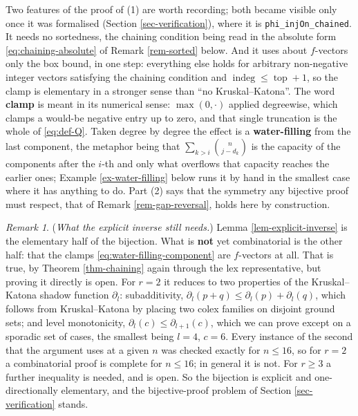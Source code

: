 \documentclass[11pt, a4paper, abstract=yes]{scrartcl}
\theoremstyle{definition}
\theoremstyle{remark}
\newtheorem{remark}[definition]{Remark}
\theoremstyle{plain}
\newcommand{\indeg}{\operatorname{indeg}}
\newcommand{\tp}{\operatorname{top}}
\begin{document}
Two features of the proof of (1) are worth recording; both became visible only once it was
formalised (Section \ref{sec-verification}), where it is \texttt{phi\_injOn\_chained}. It needs no sortedness,
the chaining condition being read in the absolute form \eqref{eq:chaining-absolute} of Remark
\ref{rem-sorted} below. And it uses about \(f\)-vectors only the box bound, in one step: everything
else holds for arbitrary non-negative integer vectors satisfying the chaining condition and
\(\indeg\le\tp+1\), so the clamp is elementary in a stronger sense than ``no Kruskal--Katona''. The
word \textbf{clamp} is meant in its numerical sense: \(\max(0,\cdot)\) applied degreewise, which clamps a
would-be negative entry up to zero, and that single truncation is the whole of \eqref{eq:def-Q}.
Taken degree by degree the effect is a \textbf{water-filling} from the last component, the metaphor being
that \(\sum_{k>i}\binom n{j-d_k}\) is the capacity of the components after the \(i\)-th and only what
overflows that capacity reaches the earlier ones; Example \ref{ex-water-filling} below runs it by hand
in the smallest case where it has anything to do. Part (2) says that the symmetry any bijective proof
must respect, that of Remark \ref{rem-gap-reversal}, holds here by construction.

\begin{remark}
(\emph{What the explicit inverse still needs.}) Lemma \ref{lem-explicit-inverse} is the elementary half
of the bijection. What is \textbf{not} yet combinatorial is the other half: that the clamps \eqref{eq:water-filling-component} are
\(f\)-vectors at all. That is true, by Theorem \ref{thm-chaining} again through the lex
representative, but proving it directly is open. For \(r=2\) it reduces to two properties of the
Kruskal--Katona shadow function \(\partial_l\): subadditivity,
\(\partial_l(p+q)\le\partial_l(p)+\partial_l(q)\), which follows from Kruskal--Katona by placing two
colex families on disjoint ground sets; and level monotonicity, \(\partial_l(c)\le\partial_{l+1}(c)\),
which we can prove except on a sporadic set of cases, the smallest being \(l=4\), \(c=6\). Every
instance of the second that the argument uses at a given \(n\) was checked exactly for \(n\le16\),
so for \(r=2\) a combinatorial proof is complete for \(n\le16\); in general it is not. For \(r\ge3\)
a further inequality is needed, and is open. So the bijection is explicit and one-directionally elementary, and the
bijective-proof problem of Section \ref{sec-verification} stands.
\label{rem-explicit-inverse}
\end{remark}
\end{document}
